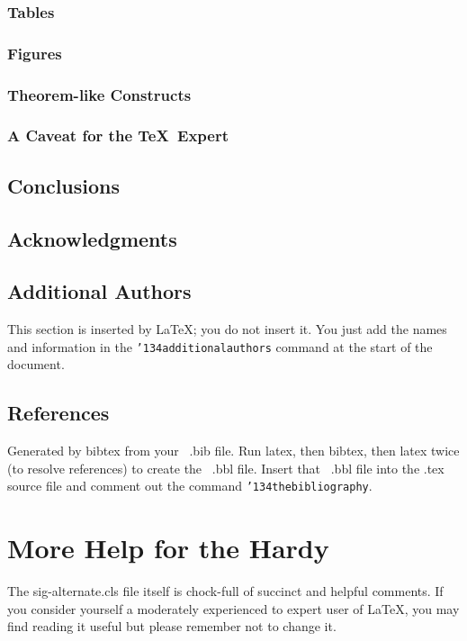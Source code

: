 \documentclass{sig-alternate}
\begin{document}
	\subsubsection{Tables}
	\subsubsection{Figures}
	\subsubsection{Theorem-like Constructs}
	\subsubsection*{A Caveat for the \TeX\ Expert}
	\subsection{Conclusions}
	\subsection{Acknowledgments}
	\subsection{Additional Authors}
	This section is inserted by \LaTeX; you do not insert it.
	You just add the names and information in the
	\texttt{{\char'134}additionalauthors} command at the start
	of the document.
	\subsection{References}
	Generated by bibtex from your ~.bib file.  Run latex,
	then bibtex, then latex twice (to resolve references)
	to create the ~.bbl file.  Insert that ~.bbl file into
	the .tex source file and comment out
	the command \texttt{{\char'134}thebibliography}.
	\section{More Help for the Hardy}
	The sig-alternate.cls file itself is chock-full of succinct
	and helpful comments.  If you consider yourself a moderately
	experienced to expert user of \LaTeX, you may find reading
	it useful but please remember not to change it.
\end{document}
